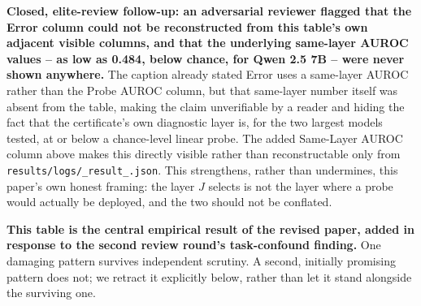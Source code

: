 \documentclass[onecolumn]{jmlr}
\begin{document}
\textbf{Closed, elite-review follow-up: an adversarial reviewer flagged
that the Error column could not be reconstructed from this table's own
adjacent visible columns, and that the underlying same-layer AUROC
values -- as low as 0.484, below chance, for Qwen 2.5 7B -- were never
shown anywhere.} The caption already stated Error uses a same-layer
AUROC rather than the Probe AUROC column, but that same-layer number
itself was absent from the table, making the claim unverifiable by a
reader and hiding the fact that the certificate's own diagnostic layer
is, for the two largest models tested, at or below a chance-level
linear probe. The added Same-Layer AUROC column above makes this
directly visible rather than reconstructable only from
\texttt{results/\allowbreak logs/\_\allowbreak result\_\allowbreak *.json}. This strengthens, rather than
undermines, this paper's own honest framing: the layer $J$ selects is
not the layer where a probe would actually be deployed, and the two
should not be conflated.

\textbf{This table is the central empirical result of the revised paper,
added in response to the second review round's task-confound finding.}
One damaging pattern survives independent scrutiny. A second, initially
promising pattern does not; we retract it explicitly below, rather than
let it stand alongside the surviving one.
\end{document}

